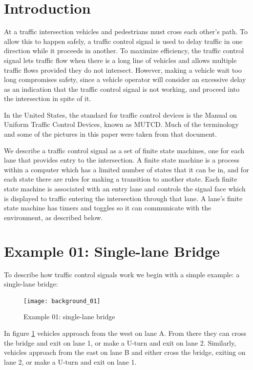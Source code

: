 \documentclass[letterpaper,twoside]{article}
\begin{document}
\section{Introduction}
At a traffic intersection vehicles and pedestrians must cross each other's
path.  To allow this to happen safely, a traffic control signal is used to
delay traffic in one direction while it proceeds in another.  To maximize
efficiency, the traffic control signal lets traffic flow when there is a
long line of vehicles and allows multiple traffic flows provided they
do not intersect.  However, making a vehicle wait too long compromises safety,
since a vehicle operator will consider an excessive  delay as an indication
that the traffic control signal is not working, and proceed into the
intersection in spite of it.

In the United States, the standard for traffic control devices is the
Manual on Uniform Traffic Control Devices, known as MUTCD\citep{MUTCD11}.
Much of the terminology and some of the pictures
in this paper were taken from that document.

We describe a traffic control signal as a set of finite state machines,
one for each lane that provides entry to the intersection.
A finite state machine is a process within a computer which has
a limited number of states that it can be in, and for each state
there are rules for making a transition to another state.
Each finite state machine is associated with an entry lane
and controls the signal face which is displayed to traffic
entering the intersection through that lane.  A lane's finite
state machine has timers and toggles so it can communicate
with the environment, as described below.

\section{Example 01: Single-lane Bridge}

To describe how traffic control signals work we begin with a simple
example: a single-lane bridge:

\begin{figure}[htb]
  {\texttt{[image: background\_01]}}
  {\caption{Example 01: single-lane bridge}\label{fig:single-lane_bridge}}
\end{figure}

In figure \ref{fig:single-lane_bridge} vehicles approach from the west
on lane A.  From there they can cross the bridge and exit on lane 1,
or make a U-turn and exit on lane 2.  Similarly, vehicles approach
from the east on lane B and either cross the bridge, exiting on lane 2,
or make a U-turn and exit on lane 1.
\end{document}
